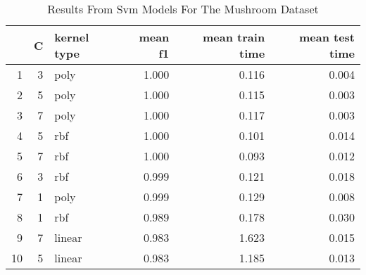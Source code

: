 \begin{table}
\centering
\caption{Results From Svm Models For The Mushroom Dataset}
\label{tab:svm_results_mushroom}
\begin{tabular}{rrlrrr}
\toprule
 & C & kernel type & mean f1 & mean train time & mean test time \\
\midrule
1 & 3 & poly & 1.000 & 0.116 & 0.004 \\
2 & 5 & poly & 1.000 & 0.115 & 0.003 \\
3 & 7 & poly & 1.000 & 0.117 & 0.003 \\
4 & 5 & rbf & 1.000 & 0.101 & 0.014 \\
5 & 7 & rbf & 1.000 & 0.093 & 0.012 \\
6 & 3 & rbf & 0.999 & 0.121 & 0.018 \\
7 & 1 & poly & 0.999 & 0.129 & 0.008 \\
8 & 1 & rbf & 0.989 & 0.178 & 0.030 \\
9 & 7 & linear & 0.983 & 1.623 & 0.015 \\
10 & 5 & linear & 0.983 & 1.185 & 0.013 \\
\bottomrule
\end{tabular}
\end{table}
